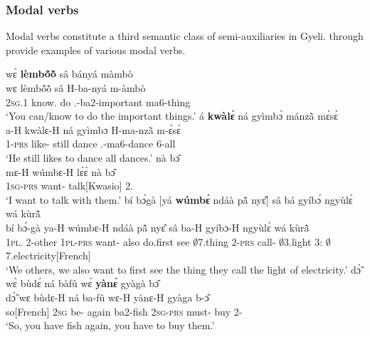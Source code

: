 \subsubsection*{Modal verbs}
Modal verbs constitute a third semantic class of semi-auxiliaries in Gyeli.  through  provide examples of various modal verbs.

\ea\label{lembo1}
  \glll wɛ̀ {\bfseries lèmbṍõ̀} sâ bányá màmbò \\
       wɛ lèmbṍõ̀ sâ H-ba-nyá m-àmbò\\
        2\textsc{sg}.{\PST}1 know.{\COMPL}  do {\OBJ}.{\LINK}-ba2-important ma6-thing\\
    \trans `You can/know to do the important things.'
\ex\label{kwale1}
  \glll á {\bfseries kwàlɛ́} ná gyìmbɔ̀ mánzã̀ mɛ́sɛ̀ \\
       a-H kwàlɛ-H ná gyìmbɔ H-ma-nzã̀ m-ɛ́sɛ̀ \\
        1-\textsc{prs} like-{\R} still dance {\OBJ}.{\LINK}-ma6-dance 6-all\\
    \trans `He still likes to dance all dances.'
\ex\label{want1}
   nà bɔ̂\\
           {\db}mɛ-H wúmbɛ-H lɛ́ɛ̀ nà bɔ̂ \\
              {\db}1\textsc{sg}-\textsc{prs} want-{\R} talk[Kwasio] {\COM} 2.{\OBJ}   \\
    \trans `I want to talk with them.'
\ex\label{want2}
  \glll  bí bɔ́gà [yá {\bfseries wúmbɛ́} ndáà pã̂ nyɛ̂] sâ bá gyíbɔ́ ngyùlɛ̀ wá kùrã̂ \\
         bí bɔ́-gà {\db}ya-H wúmbɛ-H ndáà pã̂ nyɛ̂ sâ ba-H gyíbɔ-H ngyùlɛ̀ wá kùrã̂ \\
          1\textsc{pl}.{\SBJ} 2-other {\db}1\textsc{pl}-\textsc{prs} want-{\R} also do.first see $\emptyset$7.thing 2-\textsc{prs} call-{\R} $\emptyset$3.light 3:{\ATT} $\emptyset$7.electricity[French]  \\
    \trans `We others, we also want to first see the thing they call the light of electricity.'
\ex\label{AUXmo3}
  \glll  dɔ̃̀ wɛ̀ bùdɛ́ ná bàfû wɛ́ {\bfseries yànɛ́} gyàgà bɔ̂\\
       dɔ̃̀ wɛ bùdɛ-H ná ba-fû wɛ-H yànɛ-H gyàga b-ɔ̂ \\
        so[French] 2\textsc{sg} be-{\R} again ba2-fish 2\textsc{sg}-\textsc{prs} must-{\R} buy 2-{\OBJ}  \\
    \trans `So, you have fish again, you have to buy them.'
\z



